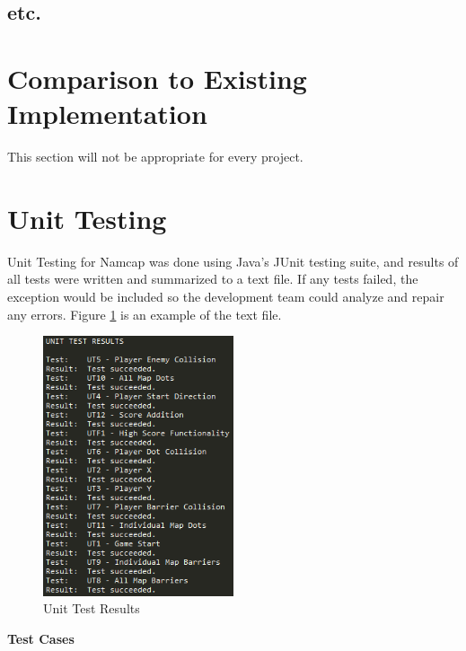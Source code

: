 \documentclass[12pt, titlepage]{article}
\begin{document}
\subsection{etc.}
	
\section{Comparison to Existing Implementation}	

This section will not be appropriate for every project.

\section{Unit Testing}

Unit Testing for Namcap was done using Java's JUnit testing suite, and results of all tests were written and summarized to a text file. If any tests failed, the exception would be included so the development team could analyze and repair any errors. Figure \ref{FigUTR} is an example of the text file.

\begin{figure}[H]
\centering
\includegraphics[width=0.5\textwidth]{UnitTestResults.png}
\caption{Unit Test Results}
\label{FigUTR}
\end{figure}

{\bf Test Cases}
\end{document}
